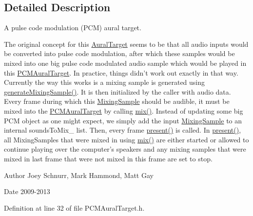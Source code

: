 \subsection{Detailed Description}
A pulse code modulation (P\-C\-M) aural target. 

The original concept for this \hyperlink{class_picto_1_1_aural_target}{Aural\-Target} seems to be that all audio inputs would be converted into pulse code modulation, after which these samples would be mixed into one big pulse code modulated audio sample which would be played in this \hyperlink{class_picto_1_1_p_c_m_aural_target}{P\-C\-M\-Aural\-Target}. In practice, things didn't work out exactly in that way. Currently the way this works is a mixing sample is generated using \hyperlink{class_picto_1_1_p_c_m_aural_target_a4b28bc26964cb9771e4381e47f37368f}{generate\-Mixing\-Sample()}. It is then initialized by the caller with audio data. Every frame during which this \hyperlink{class_picto_1_1_mixing_sample}{Mixing\-Sample} should be audible, it must be mixed into the \hyperlink{class_picto_1_1_p_c_m_aural_target}{P\-C\-M\-Aural\-Target} by calling \hyperlink{class_picto_1_1_p_c_m_aural_target_a17bce3805e561894eacd5ac20bc8cc2a}{mix()}. Instead of updating some big P\-C\-M object as one might expect, we simply add the input \hyperlink{class_picto_1_1_mixing_sample}{Mixing\-Sample} to an internal sounds\-To\-Mix\-\_\- list. Then, every frame \hyperlink{class_picto_1_1_p_c_m_aural_target_a61b64002c04ef85b30be6a24c04b43f5}{present()} is called. In \hyperlink{class_picto_1_1_p_c_m_aural_target_a61b64002c04ef85b30be6a24c04b43f5}{present()}, all Mixing\-Samples that were mixed in using \hyperlink{class_picto_1_1_p_c_m_aural_target_a17bce3805e561894eacd5ac20bc8cc2a}{mix()} are either started or allowed to continue playing over the computer's speakers and any mixing samples that were mixed in last frame that were not mixed in this frame are set to stop. \begin{DoxyAuthor}{Author}
Joey Schnurr, Mark Hammond, Matt Gay 
\end{DoxyAuthor}
\begin{DoxyDate}{Date}
2009-\/2013 
\end{DoxyDate}


Definition at line 32 of file P\-C\-M\-Aural\-Target.\-h.



